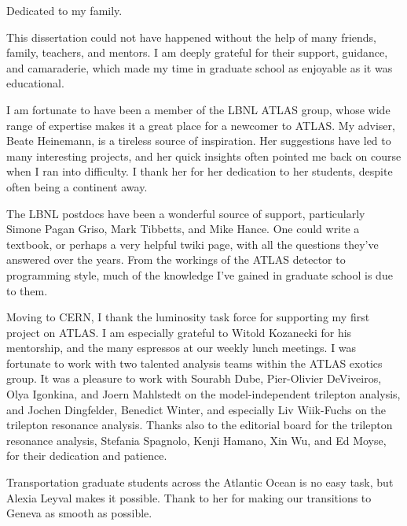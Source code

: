 \documentclass[english]{ucbthesis}
\begin{document}
\begin{frontmatter}

\begin{dedication}
\null\vfil
\begin{center}
Dedicated to my family.
\end{center}
\vfil\null
\end{dedication}

\tableofcontents
\clearpage
\listoffigures
\clearpage
\listoftables

\begin{acknowledgements}
This dissertation could not have happened without the help of many friends, family, teachers, and mentors. I am deeply grateful for their support, guidance, and camaraderie, which made my time in graduate school as enjoyable as it was educational.

I am fortunate to have been a member of the LBNL ATLAS group, whose wide range of expertise makes it a great place for a newcomer to ATLAS. My adviser, Beate Heinemann, is a tireless source of inspiration. Her suggestions have led to many interesting projects, and her quick insights often pointed me back on course when I ran into difficulty. I thank her for her dedication to her students, despite often being a continent away. 

The LBNL postdocs have been a wonderful source of support, particularly Simone Pagan Griso, Mark Tibbetts, and Mike Hance. One could write a textbook, or perhaps a very helpful twiki page, with all the questions they’ve answered over the years. From the workings of the ATLAS detector to programming style, much of the knowledge I’ve gained in graduate school is due to them. 

Moving to CERN, I thank the luminosity task force for supporting my first project on ATLAS. I am especially grateful to Witold Kozanecki for his mentorship, and the many espressos at our weekly lunch meetings. I was fortunate to work with two talented analysis teams within the ATLAS exotics group. It was a pleasure to work with Sourabh Dube, Pier-Olivier DeViveiros, Olya Igonkina, and Joern Mahlstedt on the model-independent trilepton analysis, and Jochen Dingfelder, Benedict Winter, and especially Liv Wiik-Fuchs on the trilepton resonance analysis. Thanks also to the editorial board for the trilepton resonance analysis, Stefania Spagnolo, Kenji Hamano, Xin Wu, and Ed Moyse, for their dedication and patience.

Transportation graduate students across the Atlantic Ocean is no easy task, but Alexia Leyval makes it possible. Thank to her for making our transitions to Geneva as smooth as possible. 


\end{acknowledgements}
\end{frontmatter}
\end{document}
